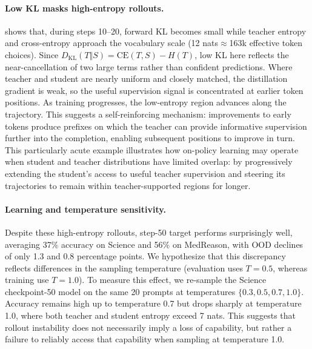 \documentclass{article} %
\theoremstyle{plain}
\theoremstyle{definition}
\theoremstyle{remark}
\begin{document}
\paragraph{Low KL masks high-entropy rollouts.}
 shows that, during steps 10--20, forward KL becomes small while teacher entropy and cross-entropy approach the vocabulary scale (12 nats$\approx$163k effective token choices). 
Since $D_{\mathrm{KL}}(T\Vert S)=\mathrm{CE}(T,S)-H(T)$, low KL here reflects the near-cancellation of two large terms rather than confident predictions. 
Where teacher and student are nearly uniform and closely matched, the distillation gradient is weak, so the useful supervision signal is concentrated at earlier token positions. As training progresses, the low-entropy region advances along the trajectory. This suggests a self-reinforcing mechanism: improvements to early tokens produce prefixes on which the teacher can provide informative supervision further into the completion, enabling subsequent positions to improve in turn. 
This particularly acute example illustrates how on-policy learning may operate when student and teacher distributions have limited overlap: by progressively extending the student's access to useful teacher supervision and steering its trajectories to remain within teacher-supported regions for longer.

\paragraph{Learning and temperature sensitivity.}
Despite these high-entropy rollouts, step-50 target performs surprisingly well, averaging 37\% accuracy on Science and 56\% on MedReason, with OOD declines of only 1.3 and 0.8 percentage points. 
We hypothesize that this discrepancy reflects differences in the sampling temperature (evaluation uses $T=0.5$, whereas training use $T=1.0$). To measure this effect, we re-sample the Science checkpoint-50 model on the same 20 prompts at temperatures $\{0.3, 0.5, 0.7, 1.0\}$. Accuracy remains high up to temperature 0.7 but drops sharply at temperature 1.0, where both teacher and student entropy exceed 7 nats. This suggests that rollout instability does not necessarily imply a loss of capability, but rather a failure to reliably access that capability when sampling at temperature 1.0.
\end{document}
